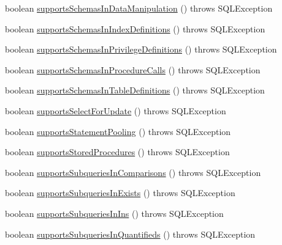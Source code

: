 \begin{DoxyCompactItemize}
boolean \mbox{\hyperlink{classcom_1_1mysql_1_1cj_1_1jdbc_1_1_database_meta_data_a95949baa3d0b11c7517ef35911461e7b}{supports\+Schemas\+In\+Data\+Manipulation}} ()  throws S\+Q\+L\+Exception 
\item 
boolean \mbox{\hyperlink{classcom_1_1mysql_1_1cj_1_1jdbc_1_1_database_meta_data_a1d8b93342e0a95fc227bfa419e2c0b7d}{supports\+Schemas\+In\+Index\+Definitions}} ()  throws S\+Q\+L\+Exception 
\item 
boolean \mbox{\hyperlink{classcom_1_1mysql_1_1cj_1_1jdbc_1_1_database_meta_data_aaa0144bd121c66c86a85ffe09bcec41b}{supports\+Schemas\+In\+Privilege\+Definitions}} ()  throws S\+Q\+L\+Exception 
\item 
boolean \mbox{\hyperlink{classcom_1_1mysql_1_1cj_1_1jdbc_1_1_database_meta_data_ae5757f6fb29d98b0aeb09b6937530a48}{supports\+Schemas\+In\+Procedure\+Calls}} ()  throws S\+Q\+L\+Exception 
\item 
boolean \mbox{\hyperlink{classcom_1_1mysql_1_1cj_1_1jdbc_1_1_database_meta_data_a7f6bb978e28b5d5f67489e73b3ec9578}{supports\+Schemas\+In\+Table\+Definitions}} ()  throws S\+Q\+L\+Exception 
\item 
boolean \mbox{\hyperlink{classcom_1_1mysql_1_1cj_1_1jdbc_1_1_database_meta_data_a035e7a96ff9eb26c5dc3fbfb33518311}{supports\+Select\+For\+Update}} ()  throws S\+Q\+L\+Exception 
\item 
boolean \mbox{\hyperlink{classcom_1_1mysql_1_1cj_1_1jdbc_1_1_database_meta_data_aea1eb480f4ce27d09bc77003a697b48a}{supports\+Statement\+Pooling}} ()  throws S\+Q\+L\+Exception 
\item 
boolean \mbox{\hyperlink{classcom_1_1mysql_1_1cj_1_1jdbc_1_1_database_meta_data_ac02a41ca47262081bc15ef3374bf9efd}{supports\+Stored\+Procedures}} ()  throws S\+Q\+L\+Exception 
\item 
boolean \mbox{\hyperlink{classcom_1_1mysql_1_1cj_1_1jdbc_1_1_database_meta_data_aac9a3076e88d2e778883e93cc5c0cdb4}{supports\+Subqueries\+In\+Comparisons}} ()  throws S\+Q\+L\+Exception 
\item 
boolean \mbox{\hyperlink{classcom_1_1mysql_1_1cj_1_1jdbc_1_1_database_meta_data_aa6d5bdc1a6a78b6493817ca74db15cdd}{supports\+Subqueries\+In\+Exists}} ()  throws S\+Q\+L\+Exception 
\item 
boolean \mbox{\hyperlink{classcom_1_1mysql_1_1cj_1_1jdbc_1_1_database_meta_data_a27640ea9fba92317515c539f362a1bde}{supports\+Subqueries\+In\+Ins}} ()  throws S\+Q\+L\+Exception 
\item 
boolean \mbox{\hyperlink{classcom_1_1mysql_1_1cj_1_1jdbc_1_1_database_meta_data_a81fa0113f5f002abf3861aae97e2db8f}{supports\+Subqueries\+In\+Quantifieds}} ()  throws S\+Q\+L\+Exception 

\end{DoxyCompactItemize}
